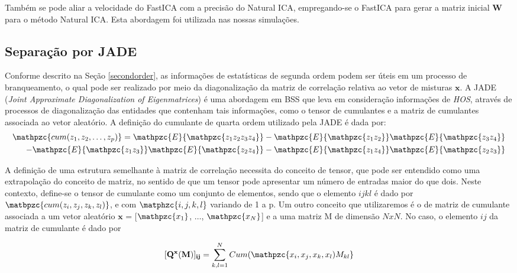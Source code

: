         Também se pode aliar a velocidade do FastICA com a precisão do Natural ICA, empregando-se o FastICA para gerar a matriz inicial $\mathbf{W}$ para o método Natural ICA. Esta abordagem foi utilizada nas nossas simulações.
    
 
    \subsection{Separação por JADE}
        Conforme descrito na Seção \ref{secondorder}, as informações de estatísticas de segunda ordem podem ser úteis em um processo de branqueamento, o qual pode ser realizado por meio da diagonalização da matriz de correlação relativa ao vetor de misturas $\mathbf{x}$. A JADE (\textit{Joint Approximate Diagonalization of Eigenmatrices})\cite{JADE} é uma abordagem em BSS que leva em consideração informações de \textit{HOS}, através de processos de diagonalização das entidades que contenham tais informações, como o tensor de cumulantes e a matriz de cumulantes associada ao vetor aleatório. A definição do cumulante de quarta ordem utilizado pela JADE é dada por:
    \begin{equation}
        \label{cumJADE}
        \begin{split}
        \mathpzc{cum(z_1,z_2,\dots,z_p)} = \mathpzc{E}\{\mathpzc{z_1z_2z_3z_4}\} - \mathpzc{E}\{\mathpzc{z_1z_2}\}\mathpzc{E}\{\mathpzc{z_3z_4}\} & \\ - \mathpzc{E}\{\mathpzc{z_1z_3}\}\mathpzc{E}\{\mathpzc{z_2z_4}\} - \mathpzc{E}\{\mathpzc{z_1z_4}\}\mathpzc{E}\{\mathpzc{z_2z_3}\}    
        \end{split}
    \end{equation}
    
    A definição de uma estrutura semelhante à matriz de correlação necessita do conceito de tensor, que pode ser entendido como uma extrapolação do conceito de matriz, no sentido de que um tensor pode apresentar um número de  entradas maior do que dois. Neste contexto, define-se o tensor de cumulante como um conjunto de elementos, sendo que o elemento ${ijkl}$ é dado por $\matbpzc{cum(z_i, z_j, z_k, z_l)}$, e com $\matphzc{i,j,k,l}$ variando de 1 a p.
    Um outro conceito que utilizaremos é o de matriz de cumulante associada a um vetor aleatório $\mathbf{x}$ = [$\mathpzc{x_1}$, $\dots$,  $\mathpzc{x_N}$] e a uma matriz M de dimensão $NxN$. No caso, o elemento $ij$ da matriz de cumulante é dado por
    
    \begin{equation}
        \mathbf{[Q^x(M)]_{ij}} = \sum_{k,l=1}^N Cum(\mathpzc{x_i,x_j,x_k,x_l)M_{kl}}
    \end{equation}
    

